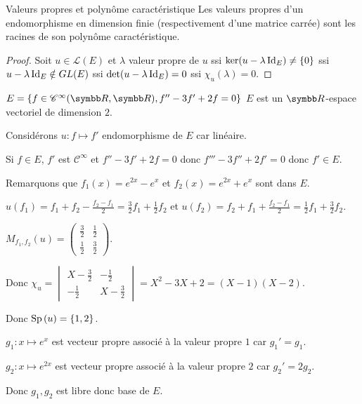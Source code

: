 \begin{theoreme}{Valeurs propres et polynôme caractéristique}{}
    Les valeurs propres d'un endomorphisme en dimension finie (respectivement d'une matrice carrée) 
    sont les racines de son polynôme caractéristique.
\end{theoreme}

\begin{proof}
    Soit $u \in \mathscr L(E)$ et $\lambda$ valeur propre de $u$ 
    ssi $\ker(u - \lambda \operatorname{Id}_E) \neq \{0\}$
    ssi $u - \lambda \operatorname{Id}_E \notin GL(E)$
    ssi $\det(u - \lambda \operatorname{Id}_E) = 0$
    ssi $\chi_u(\lambda) = 0$.
\end{proof}

\begin{exemple}
    $E = \{f \in \mathscr C^\infty(\R, \R), f'' - 3 f' + 2f = 0\}$ $E$ est un 
    $\R$-espace vectoriel de dimension $2$.

    Considérons $u : f \mapsto f'$ endomorphisme de $E$ car linéaire. 

    Si $f \in E$, $f'$ est $\mathscr C^\infty$ et $f'' - 3 f' + 2f = 0$ donc $f''' - 3 f'' + 2 f' = 0$ donc $f' \in E$.

    Remarquons que $f_1(x) = e^{2x} - e^x$ et $f_2(x) = e^{2x} + e^x$ sont dans $E$. 

    $u(f_1) = f_1 + f_2 - \frac{f_2 - f_1}{2} = \frac{3}{2} f_1 + \frac{1}{2} f_2$ et
    $u(f_2) = f_2 + f_1 + \frac{f_2 - f_1}{2} = \frac{1}{2} f_1 + \frac{3}{2} f_2$.

    $M_{f_1, f_2}(u) = \begin{pmatrix}
        \frac{3}{2} & \frac{1}{2} \\
        \frac{1}{2} & \frac{3}{2}
    \end{pmatrix}$.

    Donc $\chi_u = \begin{vmatrix}
        X - \frac{3}{2} & -\frac{1}{2} \\
        -\frac{1}{2} & X - \frac{3}{2}
    \end{vmatrix} = X^2 - 3X + 2 = (X - 1)(X - 2)$.

    Donc $\operatorname{Sp} \,(u) = \{1, 2\}$.

    $g_1 : x \mapsto e^x$ est vecteur propre associé à la valeur propre $1$ car $g_1' = g_1$.

    $g_2 : x \mapsto e^{2x}$ est vecteur propre associé à la valeur propre $2$ car $g_2' = 2 g_2$.

    Donc $g_1, g_2$ est libre donc base de $E$.
\end{exemple}

